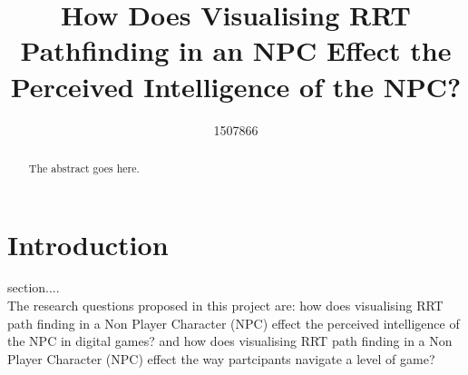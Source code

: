\documentclass[journal]{IEEEtran}
\begin{document}
%
\title{ How Does Visualising RRT Pathfinding in an NPC Effect the Perceived Intelligence of the NPC?}
%
%
\author{1507866}


\maketitle

\begin{abstract}
The abstract goes here.
\end{abstract}

\section{Introduction}
% 
% 
% 
% 
 section.... \\
The research questions proposed in this project are: how does visualising RRT path finding in a Non Player Character (NPC) effect the perceived intelligence of the NPC in digital games? and how does visualising RRT path finding in a Non Player Character (NPC) effect the way partcipants navigate a level of game? 
\end{document}

